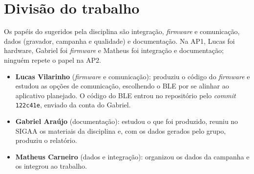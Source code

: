 \section{Divisão do trabalho}

Os papéis do \moduloDoCiclo{} sugeridos pela disciplina são integração,
\emph{firmware} e comunicação, dados (gravador, campanha e qualidade) e
documentação. Na AP1, Lucas foi hardware, Gabriel foi \emph{firmware} e
Matheus foi integração e documentação; ninguém repete o papel na AP2.

\begin{itemize}
  \item \textbf{Lucas Vilarinho} (\emph{firmware} e comunicação): produziu
    o código do \emph{firmware} e estudou as opções de comunicação,
    escolhendo o BLE por se alinhar ao aplicativo planejado. O código do
    BLE entrou no repositório pelo \emph{commit} \texttt{122c41e}, enviado
    da conta do Gabriel.
  \item \textbf{Gabriel Araújo} (documentação): estudou o que foi
    produzido, reuniu no SIGAA os materiais da disciplina e, com os dados
    gerados pelo grupo, produziu o relatório.
  \item \textbf{Matheus Carneiro} (dados e integração): organizou os dados
    da campanha e os integrou ao trabalho.
\end{itemize}

\imprimirTabelaIntegrantes
